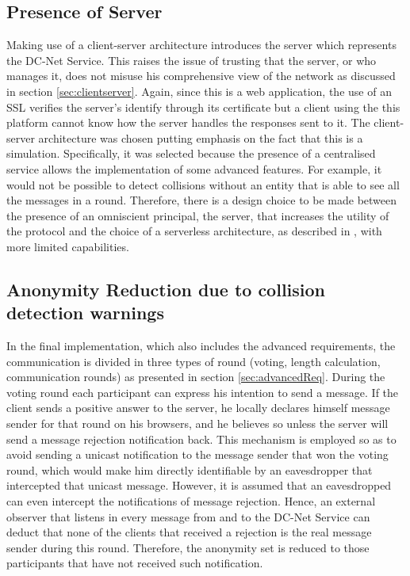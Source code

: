 \subsection{Presence of Server}
Making use of a client-server architecture introduces the server which represents the DC-Net Service. This raises the issue of trusting that the server, or who manages it, does not misuse his comprehensive view of the network as discussed in section \ref{sec:clientserver}. Again, since this is a web application, the use of an SSL verifies the server's identify through its certificate but a client using the this platform cannot know how the server handles the responses sent to it. The client-server architecture was chosen putting emphasis on the fact that this is a simulation. Specifically, it was selected because the presence of a centralised service allows the implementation of some advanced features. For example, it would not be possible to detect collisions without an entity that is able to see all the messages in a round. Therefore, there is a design choice to be made between the presence of an omniscient principal, the server, that increases the utility of the protocol and the choice of a serverless architecture, as described in \cite{Scholz}, with more limited capabilities.


\subsection{Anonymity Reduction due to collision detection warnings}
In the final implementation, which also includes the advanced requirements, the communication is divided in three types of round (voting, length calculation, communication rounds) as presented in section \ref{sec:advancedReq}. During the voting round each participant can express his intention to send a message. If the client sends a positive answer to the server, he locally declares himself message sender for that round on his browsers, and he believes so unless the server will send a message rejection notification back. This mechanism is employed so as to avoid sending a unicast notification to the message sender that won the voting round, which would make him directly identifiable by an eavesdropper that intercepted that unicast message. However, it is assumed that an eavesdropped can even intercept the notifications of message rejection. Hence, an external observer that listens in every message from and to the DC-Net Service can deduct that none of the clients that received a rejection is the real message sender during this round. Therefore, the anonymity set is reduced to those participants that have not received such notification.


